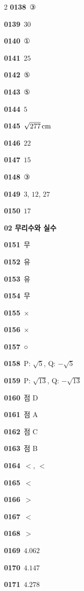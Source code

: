 \documentclass[10pt,a4paper]{article}
\begin{document}
\begin{multicols}{2}
\noindent\textbf{0138}\ ③\par
\noindent\textbf{0139}\ $30$\par
\noindent\textbf{0140}\ ①\par
\noindent\textbf{0141}\ $25$\par
\noindent\textbf{0142}\ ⑤\par
\noindent\textbf{0143}\ ⑤\par
\noindent\textbf{0144}\ $5$\par
\noindent\textbf{0145}\ $\sqrt{277}\mkern3mu \mathrm{cm}$\par
\noindent\textbf{0146}\ $22$\par
\noindent\textbf{0147}\ $15$\par
\noindent\textbf{0148}\ ③\par
\noindent\textbf{0149}\ $3$, $12$, $27$\par
\noindent\textbf{0150}\ $17$\par
\noindent\textbf{02 무리수와 실수}\par\smallskip
\noindent\textbf{0151}\ 무\par
\noindent\textbf{0152}\ 유\par
\noindent\textbf{0153}\ 유\par
\noindent\textbf{0154}\ 무\par
\noindent\textbf{0155}\ ×\par
\noindent\textbf{0156}\ ×\par
\noindent\textbf{0157}\ ○\par
\noindent\textbf{0158}\ P: $\sqrt{5}$, Q: $-\sqrt{5}$\par
\noindent\textbf{0159}\ P: $\sqrt{13}$, Q: $-\sqrt{13}$\par
\noindent\textbf{0160}\ 점 D\par
\noindent\textbf{0161}\ 점 A\par
\noindent\textbf{0162}\ 점 C\par
\noindent\textbf{0163}\ 점 B\par
\noindent\textbf{0164}\ $<$, $<$\par
\noindent\textbf{0165}\ $<$\par
\noindent\textbf{0166}\ $>$\par
\noindent\textbf{0167}\ $<$\par
\noindent\textbf{0168}\ $>$\par
\noindent\textbf{0169}\ $4.062$\par
\noindent\textbf{0170}\ $4.147$\par
\noindent\textbf{0171}\ $4.278$\par

\end{multicols}
\end{document}
